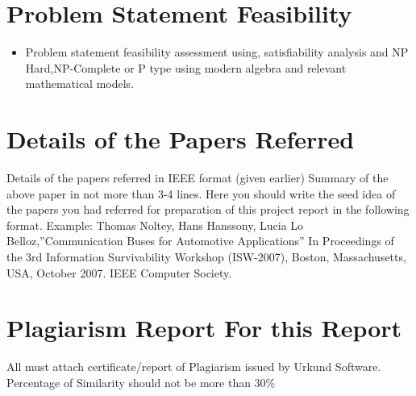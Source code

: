 \documentclass[oneside,a4paper,12pt]{report}
\begin{document}
\begin{appendices}
\chapter{Problem Statement Feasibility}
\begin{itemize}
\item Problem statement feasibility assessment using, satisfiability analysis and NP Hard,NP-Complete or P type using modern algebra and relevant mathematical models.\\ 
\end{itemize}

\chapter{Details of the Papers Referred}
Details of the papers referred in IEEE format (given earlier) Summary of the above paper in not more than 3-4 lines. Here you should write the seed idea of the papers you had referred for preparation of this project  report in the following format.
\newline
Example: 
Thomas Noltey, Hans Hanssony, Lucia Lo Belloz,”Communication Buses for Automotive Applications” In Proceedings of the 3rd Information Survivability Workshop (ISW-2007), Boston, Massachusetts, USA, October 2007. IEEE Computer Society.

\chapter{Plagiarism Report For this Report}
All must attach certificate/report of Plagiarism issued by Urkund Software. Percentage of Similarity should not be more than 30\%  

\end{appendices}
\end{document}

